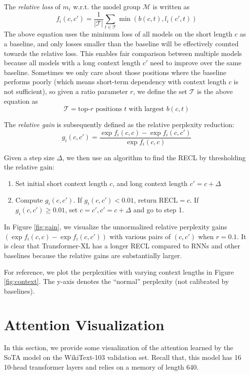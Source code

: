 The \textit{relative loss} of $m_i$ w.r.t. the model group $\mathcal{M}$ is written as
\[
f_i(c, c') = \frac{1}{|\mathcal{T}|} \sum_{t \in \mathcal{T}} \min \left( b(c, t), l_i(c', t) \right)
\]
The above equation uses the minimum loss of all models on the short length $c$ as a baseline, and only losses smaller than the baseline will be effectively counted towards the relative loss. This enables fair comparison between multiple models because all models with a long context length $c'$ need to improve over the same baseline. Sometimes we only care about those positions where the baseline performs poorly (which means short-term dependency with context length $c$ is not sufficient), so given a ratio parameter $r$, we define the set $\mathcal{T}$ is the above equation as
\[\mathcal{T} = \text{top-}r \text{~positions~} t \text{~with largest~}b(c, t)\]

The \textit{relative gain} is subsequently defined as the relative perplexity reduction:
\[
g_i(c, c') = \frac{\exp f_i(c, c) - \exp f_i(c, c')}{\exp f_i(c, c)}
\]

Given a step size $\Delta$, we then use an algorithm to find the RECL by thresholding the relative gain:
\begin{enumerate}
	\item Set initial short context length $c$, and long context length $c' = c + \Delta$
	\item Compute $g_i(c, c')$. If $g_i(c, c') < 0.01$, return $\text{RECL} = c$. If $g_i(c, c') \geq 0.01$, set $c = c', c' = c + \Delta$ and go to step 1.
\end{enumerate}

In Figure \ref{fig:gain}, we visualize the unnormalized relative perplexity gains $(\exp f_i(c, c) - \exp f_i(c, c'))$ with various pairs of $(c, c')$ when $r = 0.1$. It is clear that Transformer-XL has a longer RECL compared to RNNs and other baselines because the relative gains are substantially larger.

For reference, we plot the perplexities with varying context lengths in Figure \ref{fig:context}. The y-axis denotes the ``normal'' perplexity (not calibrated by baselines).

\section{Attention Visualization}
In this section, we provide some visualization of the attention learned by the SoTA model on the WikiText-103 validation set.
Recall that, this model has 16 10-head transformer layers and relies on a memory of length 640.

